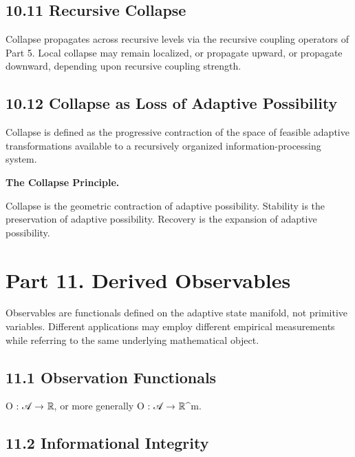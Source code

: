 \documentclass[
]{article}
\begin{document}
\hypertarget{recursive-collapse}{%
\subsection{10.11 Recursive Collapse}\label{recursive-collapse}}

Collapse propagates across recursive levels via the recursive coupling
operators of Part 5. Local collapse may remain localized, or propagate
upward, or propagate downward, depending upon recursive coupling
strength.

\hypertarget{collapse-as-loss-of-adaptive-possibility}{%
\subsection{10.12 Collapse as Loss of Adaptive
Possibility}\label{collapse-as-loss-of-adaptive-possibility}}

Collapse is defined as the progressive contraction of the space of
feasible adaptive transformations available to a recursively organized
information-processing system.

\textbf{The Collapse Principle.}

Collapse is the geometric contraction of adaptive possibility. Stability
is the preservation of adaptive possibility. Recovery is the expansion
of adaptive possibility.

\hypertarget{part-11.-derived-observables}{%
\section{Part 11. Derived
Observables}\label{part-11.-derived-observables}}

Observables are functionals defined on the adaptive state manifold, not
primitive variables. Different applications may employ different
empirical measurements while referring to the same underlying
mathematical object.

\hypertarget{observation-functionals}{%
\subsection{11.1 Observation
Functionals}\label{observation-functionals}}

O : 𝒜 → ℝ, or more generally O : 𝒜 → ℝ\^{}m.

\hypertarget{informational-integrity-1}{%
\subsection{11.2 Informational
Integrity}\label{informational-integrity-1}}
\end{document}

